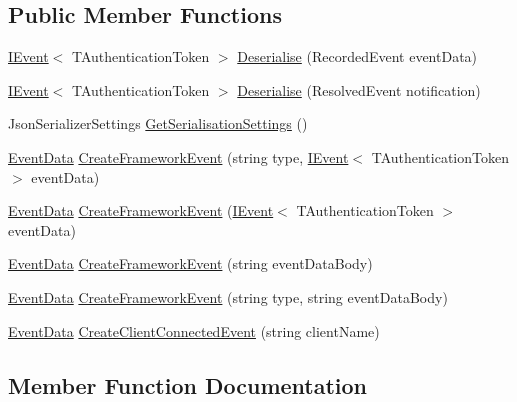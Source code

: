 \subsection*{Public Member Functions}
\begin{DoxyCompactItemize}
\item 
\hyperlink{interfaceCqrs_1_1Events_1_1IEvent}{I\+Event}$<$ T\+Authentication\+Token $>$ \hyperlink{classCqrs_1_1EventStore_1_1EventFactory_abfd04f6833e4f010234d84a591f6eb6b}{Deserialise} (Recorded\+Event event\+Data)
\item 
\hyperlink{interfaceCqrs_1_1Events_1_1IEvent}{I\+Event}$<$ T\+Authentication\+Token $>$ \hyperlink{classCqrs_1_1EventStore_1_1EventFactory_a1be7f3c4014991bc4b9619eaa2e8b9a4}{Deserialise} (Resolved\+Event notification)
\item 
Json\+Serializer\+Settings \hyperlink{classCqrs_1_1EventStore_1_1EventFactory_a4e52c4fd639d1af97b1ecc5052189783}{Get\+Serialisation\+Settings} ()
\item 
\hyperlink{classCqrs_1_1Events_1_1EventData}{Event\+Data} \hyperlink{classCqrs_1_1EventStore_1_1EventFactory_a91394437675f3185d2105c6a79f7b5aa}{Create\+Framework\+Event} (string type, \hyperlink{interfaceCqrs_1_1Events_1_1IEvent}{I\+Event}$<$ T\+Authentication\+Token $>$ event\+Data)
\item 
\hyperlink{classCqrs_1_1Events_1_1EventData}{Event\+Data} \hyperlink{classCqrs_1_1EventStore_1_1EventFactory_ae514998a8368283f882014cc0db5b2b2}{Create\+Framework\+Event} (\hyperlink{interfaceCqrs_1_1Events_1_1IEvent}{I\+Event}$<$ T\+Authentication\+Token $>$ event\+Data)
\item 
\hyperlink{classCqrs_1_1Events_1_1EventData}{Event\+Data} \hyperlink{classCqrs_1_1EventStore_1_1EventFactory_adbcf9f3c67cfef3fe894e5fb53e8b800}{Create\+Framework\+Event} (string event\+Data\+Body)
\item 
\hyperlink{classCqrs_1_1Events_1_1EventData}{Event\+Data} \hyperlink{classCqrs_1_1EventStore_1_1EventFactory_a9e04e262a8af8f60bdde7b4bf3eafebb}{Create\+Framework\+Event} (string type, string event\+Data\+Body)
\item 
\hyperlink{classCqrs_1_1Events_1_1EventData}{Event\+Data} \hyperlink{classCqrs_1_1EventStore_1_1EventFactory_a237daf998b545d170ab9f30187a0b8e7}{Create\+Client\+Connected\+Event} (string client\+Name)
\end{DoxyCompactItemize}


\subsection{Member Function Documentation}
\mbox{\label{classCqrs_1_1EventStore_1_1EventFactory_a237daf998b545d170ab9f30187a0b8e7}} 
